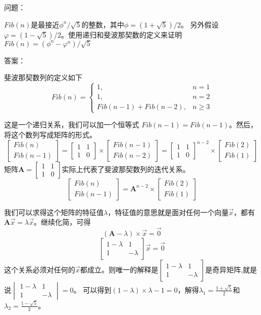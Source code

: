 \documentclass{article}
\begin{document}
\begin{CJK}{UTF8}{gkai}
问题：

$Fib(n)$是最接近$\phi^{n}/\sqrt{5}$的整数，其中$\phi=(1+\sqrt{5})/2$。 另外假设$\varphi=(1-\sqrt{5})/2$。使用递归和斐波那契数的定义来证明$Fib(n)=(\phi^{n}-\varphi^{n})/\sqrt{5}$

答案：

斐波那契数列的定义如下
\[
Fib(n) = 
\begin{cases}
	1, &\text{$n=1$}\\
	1, &\text{$n=2$}\\
	Fib(n-1) + Fib(n-2),  &\text{$n \ge 3$}
\end{cases}
\]

这是一个递归关系，我们可以加一个恒等式 $Fib(n-1) = Fib(n-1)$。然后，将这个数列写成矩阵的形式。
\[
\begin{bmatrix}
  Fib(n) \\ Fib(n-1)
\end{bmatrix}
  =
\begin{bmatrix}
  1 & 1 \\
  1 & 0
\end{bmatrix}
\times
\begin{bmatrix}
  Fib(n-1) \\ Fib(n-2)
\end{bmatrix}
  =
{\begin{bmatrix}
  1 & 1 \\
  1 & 0
\end{bmatrix}}^{n-2}
\times
\begin{bmatrix}
  Fib(2) \\ Fib(1)
\end{bmatrix}
\]
矩阵$
\mathbf{A} = 
\begin{bmatrix}
  1 & 1 \\
  1 & 0
\end{bmatrix}$实际上代表了斐波那契数列的迭代关系。
\[
\begin{bmatrix} Fib(n) \\ Fib(n-1) \end{bmatrix} = \mathbf{A}^{n-2} \times \begin{bmatrix} Fib(2) \\ Fib(1) \end{bmatrix} 
\]

我们可以求得这个矩阵的特征值$\lambda$，特征值的意思就是面对任何一个向量$\vec{x}$，都有$\mathbf{A}\vec{x}=\lambda\vec{x}$。继续化简，可得
\[
  (\mathbf{A}-\lambda) \times \vec{x} = \vec{0}
\]
\[
  \begin{bmatrix}
  1-\lambda & 1 \\
  1 & -\lambda
  \end{bmatrix} \vec{x} = \vec{0}
\]
这个关系必须对任何的$\vec{x}$都成立。则唯一的解释是$\begin{bmatrix} 1-\lambda & 1 \\ 1 & -\lambda \end{bmatrix}$是奇异矩阵,就是说$\begin{vmatrix}1-\lambda & 1 \\ 1 & -\lambda \end{vmatrix}=0$。
可以得到$(1-\lambda)\times\lambda-1=0$，解得$\lambda_{1} = \frac{1+\sqrt{5}}{2}$和$\lambda_{2}=\frac{1-\sqrt{5}}{2}$。


\end{CJK}
\end{document}
